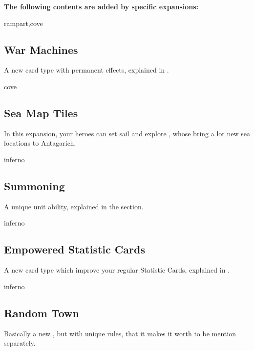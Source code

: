 \textbf{The following contents are added by specific expansions:}
\begin{multicols*}{2}
\begin{expansion}{rampart,cove}
\subsection*{War Machines}
  A new card type with permanent effects, explained in .
\end{expansion}

\vspace*{1em}
\begin{expansion}{cove}
	\subsection*{Sea Map Tiles}
	In this expansion, your heroes can set sail and explore , whose bring a lot new sea locations to Antagarich. 
\end{expansion}

\vspace*{1em}
\begin{expansion}{inferno}
\subsection*{Summoning}
  A unique unit ability, explained in the  section.
\end{expansion}

\begin{expansion}{inferno}
\subsection*{Empowered Statistic Cards}
  A new card type which improve your regular Statistic Cards, explained in .
\end{expansion}

\vspace*{1em}
\begin{expansion}{inferno}
  \subsection*{Random Town}
  Basically a new , but with unique rules, that it makes it worth to be mention separately.
\end{expansion}


\end{multicols*}
